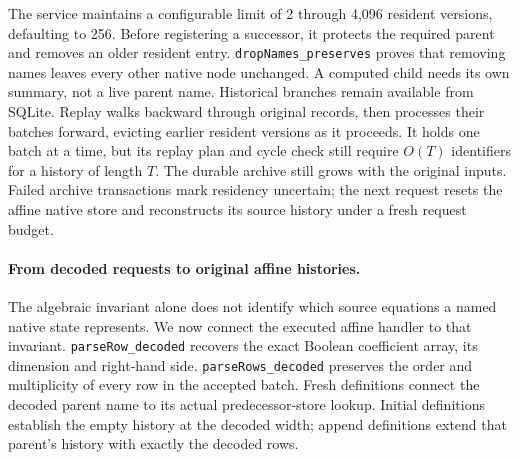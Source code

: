 \documentclass[11pt,a4paper]{article}
\numberwithin{equation}{section}
\theoremstyle{plain}
\theoremstyle{definition}
\theoremstyle{remark}
\begin{document}
The service maintains a configurable limit of 2 through 4,096 resident versions, defaulting to 256. Before registering a successor, it protects the required parent and removes an older resident entry. \texttt{dropNames\_preserves} proves that removing names leaves every other native node unchanged. A computed child needs its own summary, not a live parent name. Historical branches remain available from SQLite. Replay walks backward through original records, then processes their batches forward, evicting earlier resident versions as it proceeds. It holds one batch at a time, but its replay plan and cycle check still require $O(T)$ identifiers for a history of length $T$. The durable archive still grows with the original inputs. Failed archive transactions mark residency uncertain; the next request resets the affine native store and reconstructs its source history under a fresh request budget.

\paragraph{From decoded requests to original affine histories.}
The algebraic invariant alone does not identify which source equations a named native state represents. We now connect the executed affine handler to that invariant. \texttt{parseRow\_decoded} recovers the exact Boolean coefficient array, its dimension and right-hand side. \texttt{parseRows\_decoded} preserves the order and multiplicity of every row in the accepted batch. Fresh definitions connect the decoded parent name to its actual predecessor-store lookup. Initial definitions establish the empty history at the decoded width; append definitions extend that parent's history with exactly the decoded rows.
\end{document}
